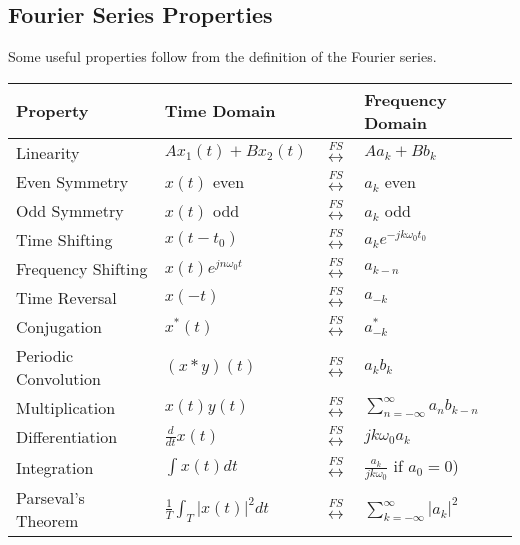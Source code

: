 \subsection{Fourier Series Properties}

Some useful properties follow from the definition
of the Fourier series.

\begin{table}[ht]
    \centering
    \label{tab:ctfourier_properties}
    \begin{tabular}{llll}
        \toprule
        \textbf{Property}    & \textbf{Time Domain}             &                                 & \textbf{Frequency Domain}                 \\
        \midrule
        Linearity            & $A x_1(t) + B x_2(t)$            & $\overset{FS}{\leftrightarrow}$ & $A a_k + B b_k$                           \\
        Even Symmetry        & $x(t)$ even                      & $\overset{FS}{\leftrightarrow}$ & $a_k$ even                                \\
        Odd Symmetry         & $x(t)$ odd                       & $\overset{FS}{\leftrightarrow}$ & $a_k$ odd                                 \\
        Time Shifting        & $x(t - t_0)$                     & $\overset{FS}{\leftrightarrow}$ & $a_k e^{-j k \omega_0 t_0}$               \\
        Frequency Shifting   & $x(t) e^{j n \omega_0 t}$        & $\overset{FS}{\leftrightarrow}$ & $a_{k - n}$                               \\
        Time Reversal        & $x(-t)$                          & $\overset{FS}{\leftrightarrow}$ & $a_{-k}$                                  \\
        Conjugation          & $x^*(t)$                         & $\overset{FS}{\leftrightarrow}$ & $a_{-k}^*$                                \\
        Periodic Convolution & $(x \ast y)(t)$                  & $\overset{FS}{\leftrightarrow}$ & $a_k b_k$                                 \\
        Multiplication       & $x(t) y(t)$                      & $\overset{FS}{\leftrightarrow}$ & $\sum_{n=-\infty}^{\infty} a_n b_{k - n}$ \\
        Differentiation      & $\frac{d}{dt} x(t)$              & $\overset{FS}{\leftrightarrow}$ & $j k \omega_0 a_k$                        \\
        Integration          & $\int x(t) dt$                   & $\overset{FS}{\leftrightarrow}$ & $\frac{a_k}{j k \omega_0}$ if $a_0 = 0$)  \\
        Parseval's Theorem   & $\frac{1}{T} \int_T |x(t)|^2 dt$ & $\overset{FS}{\leftrightarrow}$ & $\sum_{k=-\infty}^{\infty} |a_k|^2$       \\
        \bottomrule
    \end{tabular}
\end{table}

